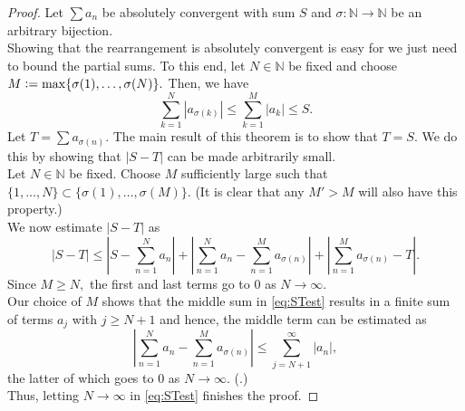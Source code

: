 \absconvdir*\label{thm:absconvdir2}
\begin{flushright}\hyperref[thm:absconvdir]{\upsym}\end{flushright}
\begin{proof}
	Let $\sum a_n$ be absolutely convergent with sum $S$ and $\sigma:\mathbb{N}\to\mathbb{N}$ be an arbitrary bijection.\\
	Showing that the rearrangement is absolutely convergent is easy for we just need to bound the partial sums. To this end, let $N \in \mathbb{N}$ be fixed and choose $M \vcentcolon= \max\{\sigma(1), \ldots, \sigma(N)\}.$ Then, we have
	\begin{equation*} 
		\sum_{k=1}^{N}|a_{\sigma(k)}| \le \sum_{k=1}^{M}|a_k| \le S.
	\end{equation*}
	Let $T = \sum a_{\sigma(n)}.$ The main result of this theorem is to show that $T = S$. We do this by showing that $|S - T|$ can be made arbitrarily small. \\
	Let $N \in \mathbb{N}$ be fixed. Choose $M$ sufficiently large such that $\{1, \ldots, N\} \subset \{\sigma(1), \ldots, \sigma(M)\}.$ (It is clear that any $M' > M$ will also have this property.)\\
	We now estimate $|S - T|$ as 
	\begin{equation} \label{eq:STest}
		|S - T| \le \left|S - \sum_{n=1}^{N}a_n\right| + \left|\sum_{n=1}^{N}a_n - \sum_{n=1}^{M}a_{\sigma(n)}\right| + \left|\sum_{n=1}^{M}a_{\sigma(n)} - T\right|.
	\end{equation}
	Since $M \ge N,$ the first and last terms go to $0$ as $N \to \infty.$\\
	Our choice of $M$ shows that the middle sum in \cref{eq:STest} results in a finite sum of terms $a_j$ with $j \ge N+1$ and hence, the middle term can be estimated as
	\begin{equation*} 
		\left|\sum_{n=1}^{N}a_n - \sum_{n=1}^{M}a_{\sigma(n)}\right| \le \sum_{j=N+1}^{\infty}|a_n|,
	\end{equation*}
	the latter of which goes to $0$ as $N \to \infty.$ (.)\\
	Thus, letting $N \to \infty$ in \cref{eq:STest} finishes the proof.
\end{proof}


